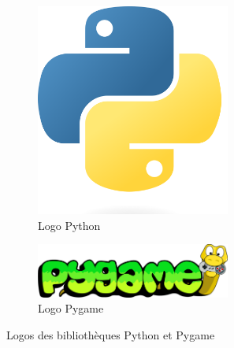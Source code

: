 \documentclass[12pt]{article}
\begin{document}
\begin{figure}[!h]
  \centering
  \begin{subfigure}[b]{0.2\textwidth}
    \centering
    \includegraphics[width=0.7\textwidth]{assets/python_logo.png}
    \caption{Logo Python}
  \end{subfigure}
  \hspace{0.6cm}
  \begin{subfigure}[b]{0.2\textwidth}
    \centering
    \includegraphics[width=0.7\textwidth]{assets/pygame_logo.png}
    \caption{Logo Pygame}
  \end{subfigure}
  \caption{Logos des bibliothèques Python et Pygame}
  \label{fig:logos_python}
\end{figure}
\end{document}
